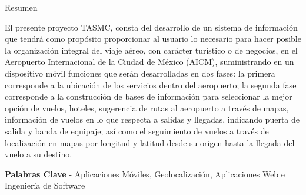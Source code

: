 \vspace{0.8cm}

\centerline{\Large Resumen}

El presente proyecto TASMC, consta del desarrollo de un sistema de información que tendrá como propósito proporcionar al usuario lo necesario para hacer posible la organización integral del viaje aéreo, con carácter turístico o de negocios, en el Aeropuerto Internacional de la Ciudad de México (AICM), suministrando en un dispositivo móvil funciones que serán desarrolladas en dos fases: la primera corresponde a la ubicación de los servicios dentro del aeropuerto; la segunda fase corresponde a la construcción de bases de información para seleccionar la mejor opción  de vuelos, hoteles, sugerencia de rutas al aeropuerto a través de mapas, información de vuelos en lo que respecta a salidas y llegadas, indicando puerta de salida y banda de equipaje; así como el seguimiento de vuelos a través de localización en mapas por longitud y latitud desde su origen hasta la llegada del vuelo a su destino.

\vspace{0.2cm}

\centerline{\textbf{Palabras Clave }- Aplicaciones Móviles, Geolocalización, Aplicaciones Web e Ingeniería de Software}